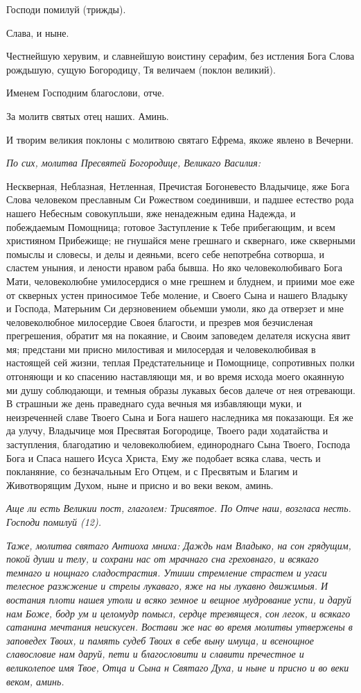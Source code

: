 Господи помилуй (трижды).

Слава, и ныне.

Честнейшую херувим, и славнейшую воистину серафим, без истления Бога Слова рождьшую, сущую Богородицу, Тя величаем (поклон великий).

Именем Господним благослови, отче.

За молитв святых отец наших. Аминь.

И творим великия поклоны с молитвою святаго Ефрема, якоже явлено в Вечерни.


\itshape По сих, молитва Пресвятей Богородице, Великаго Василия:\normalfont{}


Нескверная, Неблазная, Нетленная, Пречистая Богоневесто Владычице, яже Бога Слова человеком преславным Си Рожеством соединивши, и падшее естество рода нашего Небесным совокупльши, яже ненадежным едина Надежда, и побеждаемым Помощница; готовое Заступление к Тебе прибегающим, и всем християном Прибежище; не гнушайся мене грешнаго и сквернаго, иже скверными помыслы и словесы, и делы и деяньми, всего себе непотребна сотворша, и сластем уныния, и лености нравом раба бывша. Но яко человеколюбиваго Бога Мати, человеколюбне умилосердися о мне грешнем и блуднем, и приими мое еже от скверных устен приносимое Тебе моление, и Своего Сына и нашего Владыку и Господа, Матерьним Си дерзновением обьемши умоли, яко да отверзет и мне человеколюбное милосердие Своея благости, и презрев моя безчисленая прегрешения, обратит мя на покаяние, и Своим заповедем делателя искусна явит мя; предстани ми присно милостивая и милосердая и человеколюбивая в настоящей сей жизни, теплая Предстательнице и Помощнице, сопротивных полки отгоняющи и ко спасению наставляющи мя, и во время исхода моего окаянную ми душу соблюдающи, и темныя образы лукавых бесов далече от нея отревающи. В страшныи же день праведнаго суда вечныя мя избавляющи муки, и неизреченней славе Твоего Сына и Бога нашего наследника мя показающи. Ея же да улучу, Владычице моя Пресвятая Богородице, Твоего ради ходатайства и заступления, благодатию и человеколюбием, единороднаго Сына Твоего, Господа Бога и Спаса нашего Исуса Христа, Ему же подобает всяка слава, честь и покланяние, со безначальным Его Отцем, и с Пресвятым и Благим и Животворящим Духом, ныне и присно и во веки веком, аминь.


\itshape Аще ли есть Великии пост, глаголем:\normalfont{} Трисвятое. По Отче наш, возгласа несть. Господи помилуй (12).


\itshape Таже, молитва святаго Антиоха мниха:\normalfont{} Даждь нам Владыко, на сон грядущим, покой души и телу, и сохрани нас от мрачнаго сна греховнаго, и всякаго темнаго и нощнаго сладострастия. Утиши стремление страстем и угаси телесное разжжение и стрелы лукаваго, яже на ны лукавно движимыя. И востания плоти нашея утоли и всяко земное и вещное мудрование успи, и даруй нам Боже, бодр ум и целомудр помысл, сердце трезвящеся, сон легок, и всякаго сатанина мечтания неискусен. Востави же нас во время молитвы утвержены в заповедех Твоих, и память судеб Твоих в себе выну имуща,  и всенощное славословие нам даруй, пети и благословити и славити пречестное и великолепое имя Твое, Отца и Сына н Святаго Духа, и ныне и присно и во веки веком, аминь.

